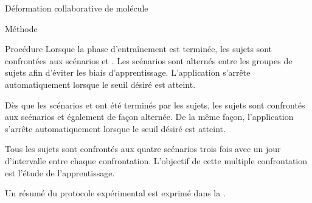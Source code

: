 \documentclass[myfrancais]{mythesis}
\begin{document}
\begin{mychapter}{Déformation collaborative de molécule}
\begin{mysection}{Méthode}
\begin{mysubsection}{Procédure}
				Lorsque la phase d'entraînement est terminée, les sujets sont confrontées aux scénarios  et .
				Les scénarios sont alternés entre les groupes de sujets afin d'éviter les biais d'apprentissage.
				L'application s'arrête automatiquement lorsque le seuil  désiré est atteint.

				Dès que les scénarios  et  ont été terminés par les sujets, les sujets sont confrontés aux scénarios  et  également de façon alternée.
				De la même façon, l'application s'arrête automatiquement lorsque le seuil  désiré est atteint.

				Tous les sujets sont confrontés aux quatre scénarios trois fois avec un jour d'intervalle entre chaque confrontation.
				L'objectif de cette multiple confrontation est l'étude de l'apprentissage.

				Un résumé du protocole expérimental est exprimé dans la .


\end{mysubsection}
\end{mysection}
\end{mychapter}
\end{document}
